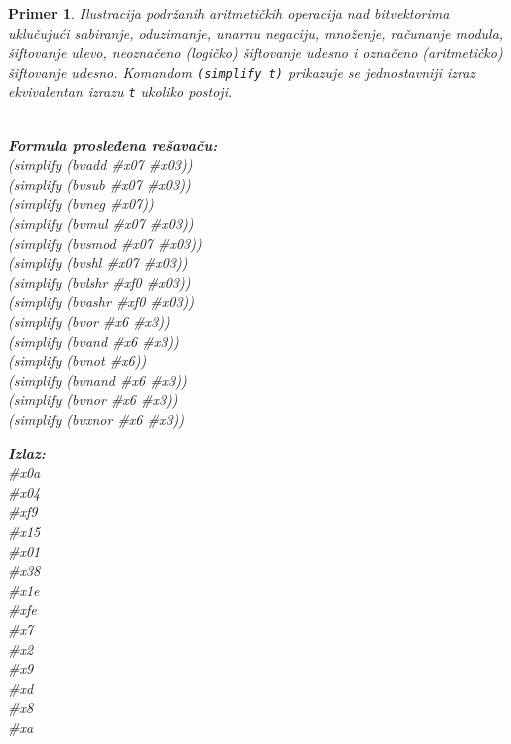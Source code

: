 \documentclass[12pt,oneside]{memoir}
\newtheorem{primer}{Primer}
\begin{document}
\begin{primer} Ilustracija podržanih aritmetičkih operacija nad bitvektorima uklučujući sabiranje, oduzimanje, unarnu negaciju, množenje, računanje modula, šiftovanje ulevo, neoznačeno (logičko) šiftovanje udesno i označeno (aritmetičko) šiftovanje udesno.
Komandom \texttt{(simplify t)} prikazuje se jednostavniji izraz ekvivalentan izrazu \texttt{t} ukoliko postoji.
\\\\
\begin{minipage}[b]{0.5\textwidth}
\textbf{Formula prosleđena rešavaču:}
\\(simplify (bvadd \#x07 \#x03)) 
\\(simplify (bvsub \#x07 \#x03))
\\(simplify (bvneg \#x07)) 
\\(simplify (bvmul \#x07 \#x03)) 
\\(simplify (bvsmod \#x07 \#x03)) 
\\(simplify (bvshl \#x07 \#x03)) 
\\(simplify (bvlshr \#xf0 \#x03)) 
\\(simplify (bvashr \#xf0 \#x03)) 
\\(simplify (bvor \#x6 \#x3)) 
\\(simplify (bvand \#x6 \#x3))  
\\(simplify (bvnot \#x6)) 
\\(simplify (bvnand \#x6 \#x3)) 
\\(simplify (bvnor \#x6 \#x3)) 
\\(simplify (bvxnor \#x6 \#x3)) 

\end{minipage}
\hspace{2.5cm}
\begin{minipage}[b]{0.5\textwidth}
\textbf{Izlaz:}
\\\#x0a 
\\\#x04 
\\\#xf9 
\\\#x15 
\\\#x01 
\\\#x38 
\\\#x1e 
\\\#xfe
\\\#x7 
\\\#x2 
\\\#x9 
\\\#xd 
\\\#x8 
\\\#xa
\end{minipage}

\end{primer}
\end{document}
